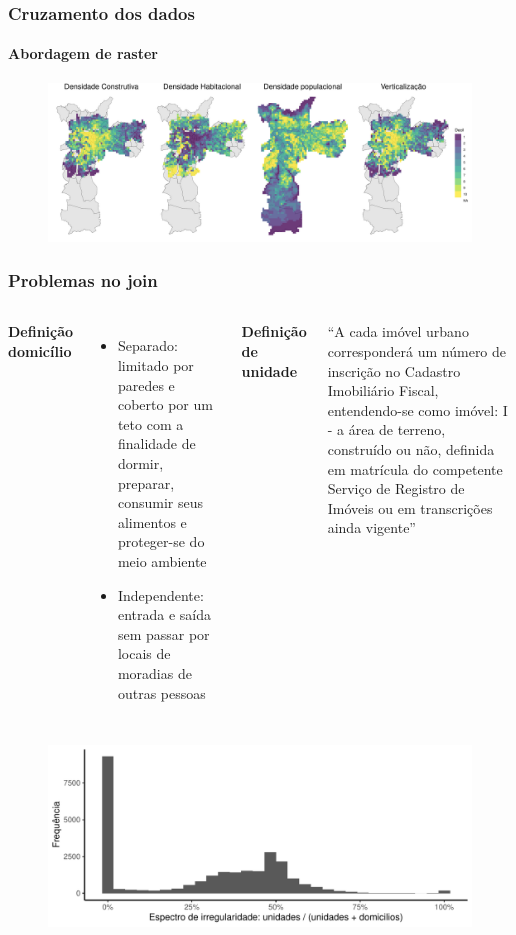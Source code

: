 \documentclass[%
    8pt, 
    aspectratio=169,
]{beamer}
\begin{document}
\begin{frame}
    \frametitle{Cruzamento dos dados}
    \framesubtitle{Abordagem de raster}

    \begin{figure}
        \centering
        \includegraphics[width = \linewidth]{imagens/rasters_wide.pdf}
    \end{figure}
\end{frame}

\begin{frame}
    \frametitle{Problemas no join}
    \begin{columns}[T]
        \textbf{Definição domicílio}
        \smallskip

        \begin{itemize}
            \item Separado: limitado por paredes e coberto por um teto com a finalidade de dormir, preparar, consumir seus alimentos e proteger-se do meio ambiente
            \item Independente: entrada e saída sem passar por locais de moradias de outras pessoas
        \end{itemize}

        \textbf{Definição de unidade}
        \smallskip

        ``A cada imóvel urbano corresponderá um número de inscrição no Cadastro Imobiliário Fiscal, entendendo-se como imóvel: I - a área de terreno, construído ou não, definida em matrícula do competente Serviço de Registro de Imóveis ou em transcrições ainda vigente''
    \end{columns}

    \begin{figure}
        \centering
        \includegraphics[width = .7\textwidth]{imagens/disparidade_censoIPTU.pdf}
    \end{figure}
\end{frame}
\end{document}
